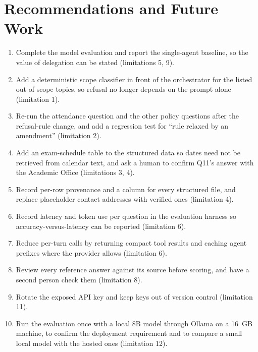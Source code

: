 \documentclass[10pt,a4paper]{article}
\newcommand{\code}[1]{\texttt{\detokenize{#1}}}
\begin{document}
\section{Recommendations and Future Work}\label{sec:future}
\begin{enumerate}
  \item Complete the model evaluation and report the single-agent baseline, so the value of delegation can be stated (limitations 5, 9).
  \item Add a deterministic scope classifier in front of the orchestrator for the listed out-of-scope topics, so refusal no longer depends on the prompt alone (limitation 1).
  \item Re-run the attendance question and the other policy questions after the refusal-rule change, and add a regression test for ``rule relaxed by an amendment'' (limitation 2).
  \item Add an exam-schedule table to the structured data so dates need not be retrieved from calendar text, and ask a human to confirm Q11's answer with the Academic Office (limitations 3, 4).
  \item Record per-row provenance and a \code{verified} column for every structured file, and replace placeholder contact addresses with verified ones (limitation 4).
  \item Record latency and token use per question in the evaluation harness so accuracy-versus-latency can be reported (limitation 6).
  \item Reduce per-turn calls by returning compact tool results and caching agent prefixes where the provider allows (limitation 6).
  \item Review every reference answer against its source before scoring, and have a second person check them (limitation 8).
  \item Rotate the exposed API key and keep keys out of version control (limitation 11).
  \item Run the evaluation once with a local 8B model through Ollama on a 16~GB machine, to confirm the deployment requirement and to compare a small local model with the hosted ones (limitation 12).
\end{enumerate}

\end{document}
